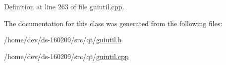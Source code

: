 Definition at line 263 of file guiutil.\+cpp.



The documentation for this class was generated from the following files\+:\begin{DoxyCompactItemize}
\item 
/home/dev/ds-\/160209/src/qt/\hyperlink{guiutil_8h}{guiutil.\+h}\item 
/home/dev/ds-\/160209/src/qt/\hyperlink{guiutil_8cpp}{guiutil.\+cpp}\end{DoxyCompactItemize}
